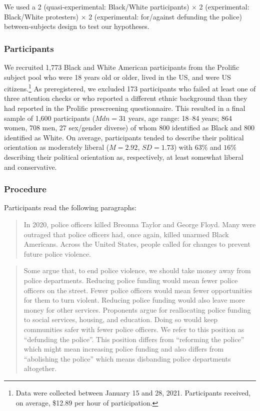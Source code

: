 \documentclass[12pt, letterpaper]{article}
\begin{document}
We used a 2 (quasi-experimental: Black/White participants) \(\times\) 2
(experimental: Black/White protesters) \(\times\) 2 (experimental:
for/against defunding the police) between-subjects design to test our
hypotheses.

\hypertarget{participants-1}{%
\subsubsection{Participants}\label{participants-1}}

We recruited 1,773 Black and White American participants from the
Prolific subject pool who were 18 years old or older, lived in the US,
and were US citizens.\footnote{Data were collected between January 15
  and 28, 2021. Participants received, on average, \$12.89 per hour of
  participation.} As preregistered, we excluded 173 participants who
failed at least one of three attention checks or who reported a
different ethnic background than they had reported in the Prolific
prescreening questionnaire. This resulted in a final sample of 1,600
participants (\(\textit{Mdn} = 31\) years, age range: 18--84 years; 864
women, 708 men, 27 sex/gender diverse) of whom 800 identified as Black
and 800 identified as White. On average, participants tended to describe
their political orientation as moderately liberal
(\(\textit{M} = 2.92\), \(\textit{SD} = 1.73\)) with \(63\%\) and
\(16\%\) describing their political orientation as, respectively, at
least somewhat liberal and conservative.

\hypertarget{procedure-1}{%
\subsubsection{Procedure}\label{procedure-1}}

Participants read the following paragraphs:

\begin{quote}
In 2020, police officers killed Breonna Taylor and George Floyd. Many
were outraged that police officers had, once again, killed unarmed Black
Americans. Across the United States, people called for changes to
prevent future police violence.
\end{quote}

\begin{quote}
Some argue that, to end police violence, we should take money away from
police departments. Reducing police funding would mean fewer police
officers on the street. Fewer police officers would mean fewer
opportunities for them to turn violent. Reducing police funding would
also leave more money for other services. Proponents argue for
reallocating police funding to social services, housing, and education.
Doing so would keep communities safer with fewer police officers. We
refer to this position as ``defunding the police''. This position
differs from ``reforming the police'' which might mean increasing police
funding and also differs from ``abolishing the police'' which means
disbanding police departments altogether.
\end{quote}
\end{document}
